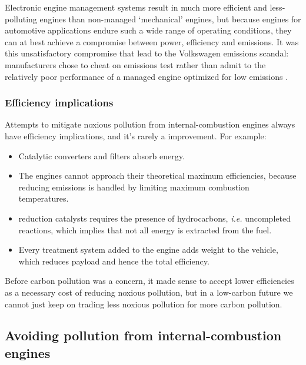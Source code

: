 Electronic engine management systems result in much more efficient and
less-polluting engines than non-managed `mechanical' engines, but because
engines for automotive applications endure such a wide range of operating
conditions, they can at best achieve a compromise between power, efficiency and
emissions. It was this unsatisfactory compromise that lead to the Volkswagen
emissions scandal: manufacturers chose to cheat on emissions test rather than
admit to the relatively poor performance of a managed engine optimized for low
emissions \autocite{Mansouri2016}.

\subsubsection{Efficiency implications}

Attempts to mitigate noxious pollution from internal\hyp{}combustion engines
always have efficiency implications, and it's rarely a improvement. For example:

\begin{itemize}

\item Catalytic converters and filters absorb energy.
  
\item The engines cannot approach their theoretical maximum efficiencies,
because reducing \nox emissions is handled by limiting maximum combustion
temperatures.

\item \nox reduction catalysts requires the presence of hydrocarbons, \textit{i.e.}
uncompleted reactions, which implies that not all energy is extracted from the
fuel.

\item Every treatment system added to the engine adds weight to the vehicle, which
reduces payload and hence the total efficiency.

\end{itemize}

Before carbon pollution was a concern, it made sense to accept lower
efficiencies as a necessary cost of reducing noxious pollution, but in a
low-carbon future we cannot just keep on trading less noxious pollution for more
carbon pollution.

\subsection{Avoiding pollution from internal\hyp{}combustion engines} \label{par:carbon-neutral}

